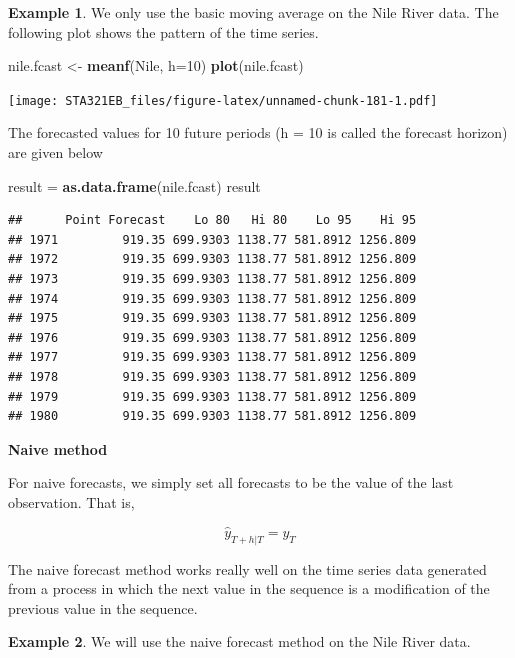 \documentclass[
]{book}
\newenvironment{Shaded}{\begin{snugshade}}{\end{snugshade}}
\newcommand{\AttributeTok}[1]{\textcolor[rgb]{0.13,0.29,0.53}{#1}}
\newcommand{\DecValTok}[1]{\textcolor[rgb]{0.00,0.00,0.81}{#1}}
\newcommand{\FunctionTok}[1]{\textcolor[rgb]{0.13,0.29,0.53}{\textbf{#1}}}
\newcommand{\NormalTok}[1]{#1}
\newcommand{\OtherTok}[1]{\textcolor[rgb]{0.56,0.35,0.01}{#1}}
\begin{document}
\textbf{Example 1}. We only use the basic moving average on the Nile River data. The following plot shows the pattern of the time series.

\begin{Shaded}
\begin{Highlighting}[]
\NormalTok{nile.fcast }\OtherTok{\textless{}{-}} \FunctionTok{meanf}\NormalTok{(Nile, }\AttributeTok{h=}\DecValTok{10}\NormalTok{)}
\FunctionTok{plot}\NormalTok{(nile.fcast)}
\end{Highlighting}
\end{Shaded}

\texttt{[image: STA321EB\_files/figure-latex/unnamed-chunk-181-1.pdf]}

The forecasted values for 10 future periods (h = 10 is called the forecast horizon) are given below

\begin{Shaded}
\begin{Highlighting}[]
\NormalTok{result }\OtherTok{=} \FunctionTok{as.data.frame}\NormalTok{(nile.fcast)}
\NormalTok{result}
\end{Highlighting}
\end{Shaded}

\begin{verbatim}
##      Point Forecast    Lo 80   Hi 80    Lo 95    Hi 95
## 1971         919.35 699.9303 1138.77 581.8912 1256.809
## 1972         919.35 699.9303 1138.77 581.8912 1256.809
## 1973         919.35 699.9303 1138.77 581.8912 1256.809
## 1974         919.35 699.9303 1138.77 581.8912 1256.809
## 1975         919.35 699.9303 1138.77 581.8912 1256.809
## 1976         919.35 699.9303 1138.77 581.8912 1256.809
## 1977         919.35 699.9303 1138.77 581.8912 1256.809
## 1978         919.35 699.9303 1138.77 581.8912 1256.809
## 1979         919.35 699.9303 1138.77 581.8912 1256.809
## 1980         919.35 699.9303 1138.77 581.8912 1256.809
\end{verbatim}

\textbf{Naive method}

For naive forecasts, we simply set all forecasts to be the value of the last observation. That is,

\[
 \hat{y}_{T+h|T} = y_T
 \]

The naive forecast method works really well on the time series data generated from a process in which the next value in the sequence is a modification of the previous value in the sequence.

\textbf{Example 2}. We will use the naive forecast method on the Nile River data.
\end{document}
